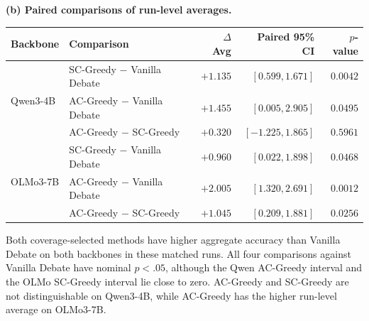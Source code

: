 \begin{table}[t]
\vspace{0.7em}
\textbf{(b) Paired comparisons of run-level averages.}\\[0.25em]
\scriptsize
\begin{tabular}{llrrr}
\toprule
Backbone & Comparison & $\Delta$ Avg & Paired 95\% CI & $p$-value \\
\midrule
\multirow{3}{*}{Qwen3-4B}
 & SC-Greedy $-$ Vanilla Debate & $+1.135$ & $[0.599, 1.671]$ & $0.0042$ \\
 & AC-Greedy $-$ Vanilla Debate & $+1.455$ & $[0.005, 2.905]$ & $0.0495$ \\
 & AC-Greedy $-$ SC-Greedy & $+0.320$ & $[-1.225, 1.865]$ & $0.5961$ \\
\midrule
\multirow{3}{*}{OLMo3-7B}
 & SC-Greedy $-$ Vanilla Debate & $+0.960$ & $[0.022, 1.898]$ & $0.0468$ \\
 & AC-Greedy $-$ Vanilla Debate & $+2.005$ & $[1.320, 2.691]$ & $0.0012$ \\
 & AC-Greedy $-$ SC-Greedy & $+1.045$ & $[0.209, 1.881]$ & $0.0256$ \\
\bottomrule
\end{tabular}
\end{table}

Both coverage-selected methods have higher aggregate accuracy than Vanilla
Debate on both backbones in these matched runs. All four comparisons against
Vanilla Debate have nominal $p<.05$, although the Qwen AC-Greedy interval and
the OLMo SC-Greedy interval lie close to zero. AC-Greedy and SC-Greedy are not
distinguishable on Qwen3-4B, while AC-Greedy has the higher run-level average
on OLMo3-7B.
